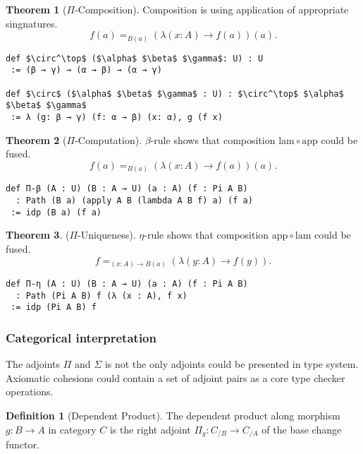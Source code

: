 \documentclass{article}
\theoremstyle{definition}
\newtheorem{definition}{Definition}
\newtheorem{theorem}{Theorem}
\begin{document}
\begin{theorem}[$\Pi$-Composition]
Composition is using application of appropriate singnatures.
$$f(a) =_{B(a)} (\lambda (x:A) \rightarrow f(a))(a).$$
\begin{lstlisting}[mathescape=true]
def $\circ^\top$ ($\alpha$ $\beta$ $\gamma$: U) : U
 := (β → γ) → (α → β) → (α → γ)

def $\circ$ ($\alpha$ $\beta$ $\gamma$ : U) : $\circ^\top$ $\alpha$ $\beta$ $\gamma$
 := λ (g: β → γ) (f: α → β) (x: α), g (f x)
\end{lstlisting}
\end{theorem}

\begin{theorem}[$\Pi$-Computation]
$\beta$-rule shows that composition $\mathrm{lam} \circ \mathrm{app}$ could be fused.
$$ f(a) =_{B(a)} (\lambda (x:A) \rightarrow f(a))(a).$$
\begin{lstlisting}[mathescape=true]
def Π-β (A : U) (B : A → U) (a : A) (f : Pi A B)
  : Path (B a) (apply A B (lambda A B f) a) (f a)
 := idp (B a) (f a)
\end{lstlisting}
\end{theorem}

\begin{theorem} ($\Pi$-Uniqueness).
$\eta$-rule shows that composition $\mathrm{app} \circ \mathrm{lam}$ could be fused.
$$ f =_{(x:A)\rightarrow B(a)} (\lambda (y:A) \rightarrow f(y)). $$
\begin{lstlisting}[mathescape=true]
def Π-η (A : U) (B : A → U) (a : A) (f : Pi A B)
  : Path (Pi A B) f (λ (x : A), f x)
 := idp (Pi A B) f
\end{lstlisting}
\end{theorem}

\subsubsection*{Categorical interpretation}

The adjoints $\Pi$ and $\Sigma$ is not the only adjoints could be presented in type system.
Axiomatic cohesions could contain a set of adjoint pairs as a core type checker operations.

\begin{definition}[Dependent Product]
The dependent product along morphism $g: B \rightarrow A$ in category $C$ is the right
adjoint $\Pi_g : C_{/B} \rightarrow C_{/A}$ of the base change functor.
\end{definition}
\end{document}
